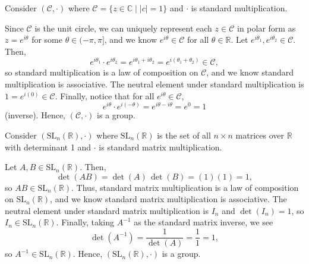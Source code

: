 \begin{exer}
Consider $ (\mathcal{C},\cdot) $ where $ \mathcal{C}=\{z\in\mathbb{C}\mid\lvert c\rvert=1\} $ and $ \cdot $ is standard multiplication.
\end{exer}
\begin{sltn}
Since $ \mathcal{C} $ is the unit circle, we can uniquely represent each $ z\in\mathcal{C} $ in polar form as $ z=e^{i\theta} $ for some $ \theta\in(-\pi,\pi] $, and we know $ e^{i\theta}\in\mathcal{C} $ for all $ \theta\in\mathbb{R} $. Let $ e^{i\theta_1},e^{i\theta_2}\in\mathcal{C} $. Then,
\begin{equation*}
    e^{i\theta_1}\cdot e^{i\theta_2}=e^{i\theta_1+i\theta_2}=e^{i(\theta_1+\theta_2)}\in\mathcal{C},
\end{equation*}
so standard multiplication is a law of composition on $ \mathcal{C} $, and we know standard multiplication is associative. The neutral element under standard multiplication is $ 1=e^{i(0)}\in\mathcal{C} $. Finally, notice that for all $ e^{i\theta}\in\mathcal{C} $,
\begin{equation*}
    e^{i\theta}\cdot e^{i(-\theta)}=e^{i\theta-i\theta}=e^0=1
\end{equation*}
(inverse). Hence, $ (\mathcal{C},\cdot) $ is a group.
\end{sltn}

\begin{exer}
Consider $ (\mathrm{SL}_n(\mathbb{R}),\cdot) $ where $ \mathrm{SL}_n(\mathbb{R}) $ is the set of all $ n\times n $ matrices over $ \mathbb{R} $ with determinant 1 and $ \cdot $ is standard matrix multiplication.
\end{exer}
\begin{sltn}
Let $ A,B\in\mathrm{SL}_n(\mathbb{R}) $. Then,
\begin{equation*}
    \det(AB)=\det(A)\,\det(B)=(1)(1)=1,
\end{equation*}
so $ AB\in\mathrm{SL}_n(\mathbb{R}) $. Thus, standard matrix multiplication is a law of composition on $ \mathrm{SL}_n(\mathbb{R}) $, and we know standard matrix multiplication is associative. The neutral element under standard matrix multiplication is $ I_n $ and $ \det(I_n)=1 $, so $ I_n\in\mathrm{SL}_n(\mathbb{R}) $. Finally, taking $ A^{-1} $ as the standard matrix inverse, we see
\begin{equation*}
    \det(A^{-1})=\frac{1}{\det(A)}=\frac{1}{1}=1,
\end{equation*}
so $ A^{-1}\in\mathrm{SL}_n(\mathbb{R}) $. Hence, $ (\mathrm{SL}_n(\mathbb{R}),\cdot) $ is a group.
\end{sltn}

